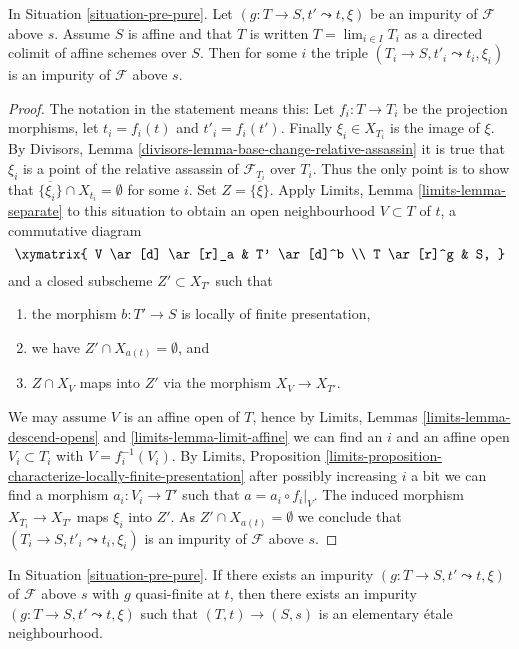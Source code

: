 \begin{lemma}
\label{lemma-impure-limit}
In Situation \ref{situation-pre-pure}.
Let $(g : T \to S, t' \leadsto t, \xi)$ be an impurity of
$\mathcal{F}$ above $s$. Assume $S$ is affine and that $T$
is written $T = \lim_{i \in I} T_i$ as a directed colimit
of affine schemes over $S$. Then for some $i$ the triple
$(T_i \to S, t'_i \leadsto t_i, \xi_i)$ is an impurity of
$\mathcal{F}$ above $s$.
\end{lemma}

\begin{proof}
The notation in the statement means this: Let $f_i : T \to T_i$
be the projection morphisms, let $t_i = f_i(t)$ and $t'_i = f_i(t')$.
Finally $\xi_i \in X_{T_i}$ is the image of $\xi$. By
Divisors, Lemma \ref{divisors-lemma-base-change-relative-assassin}
it is true that $\xi_i$ is a point of the relative
assassin of $\mathcal{F}_{T_i}$ over $T_i$. Thus the only point is to
show that $\overline{\{\xi_i\}} \cap X_{t_i} = \emptyset$ for some
$i$. Set $Z = \overline{\{\xi\}}$. Apply
Limits, Lemma \ref{limits-lemma-separate}
to this situation to obtain an open neighbourhood
$V \subset T$ of $t$, a commutative diagram
$$
\xymatrix{
V \ar[d] \ar[r]_a & T' \ar[d]^b \\
T \ar[r]^g & S,
}
$$
and a closed subscheme $Z' \subset X_{T'}$ such that
\begin{enumerate}
\item the morphism $b : T' \to S$ is locally of finite presentation,
\item we have $Z' \cap X_{a(t)} = \emptyset$, and
\item $Z \cap X_V$ maps into $Z'$ via the morphism $X_V \to X_{T'}$.
\end{enumerate}
We may assume $V$ is an affine open of $T$, hence by
Limits, Lemmas \ref{limits-lemma-descend-opens} and
\ref{limits-lemma-limit-affine}
we can find an $i$ and an affine open $V_i \subset T_i$ with
$V = f_i^{-1}(V_i)$. By
Limits,
Proposition \ref{limits-proposition-characterize-locally-finite-presentation}
after possibly increasing $i$ a bit we can find a morphism
$a_i : V_i \to T'$ such that $a = a_i \circ f_i|_V$.
The induced morphism $X_{T_i} \to X_{T'}$ maps $\xi_i$ into
$Z'$. As $Z' \cap X_{a(t)} = \emptyset$ we conclude that
$(T_i \to S, t'_i \leadsto t_i, \xi_i)$ is an impurity of
$\mathcal{F}$ above $s$.
\end{proof}

\begin{lemma}
\label{lemma-quasi-finite-impurity-elementary}
In Situation \ref{situation-pre-pure}.
If there exists an impurity $(g : T \to S, t' \leadsto t, \xi)$
of $\mathcal{F}$ above $s$ with $g$ quasi-finite at $t$, then there
exists an impurity $(g : T \to S, t' \leadsto t, \xi)$ such that
$(T, t) \to (S, s)$ is an elementary \'etale neighbourhood.
\end{lemma}

